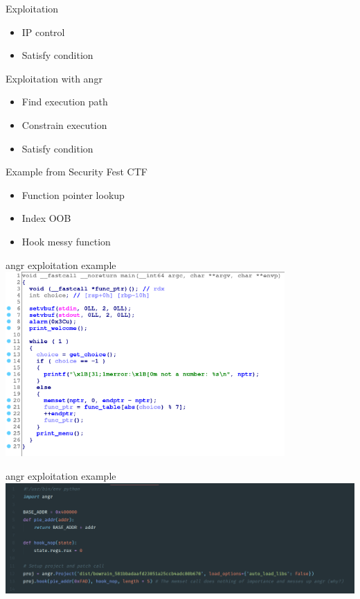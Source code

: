 \documentclass[10pt, compress]{beamer}
\begin{document}
\begin{frame}{Exploitation}
  \begin{itemize}
    \item IP control
    \item Satisfy condition
  \end{itemize}
\end{frame}

\begin{frame}{Exploitation with angr}
  \begin{itemize}
    \item Find execution path
    \item Constrain execution
    \item Satisfy condition
  \end{itemize}
\end{frame}

\begin{frame}{Example from Security Fest CTF}
  \begin{itemize}
    \item Function pointer lookup
    \item Index OOB
    \item Hook messy function
  \end{itemize}
\end{frame}


\begin{frame}{angr exploitation example}
  \includegraphics[width=0.8\textwidth]{images/exploit-2-ida.png}
\end{frame}

\begin{frame}{angr exploitation example}
  \includegraphics[width=\textwidth]{images/exploit-1-angr-a.png}
\end{frame}
\end{document}
